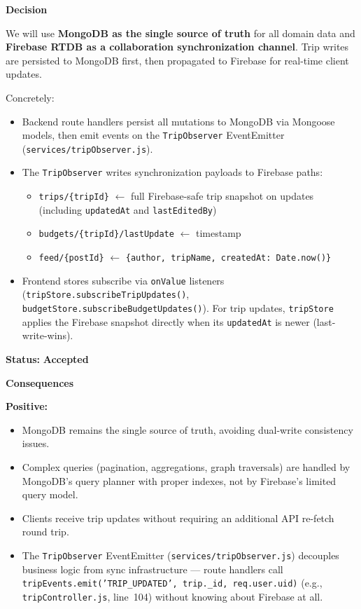 \documentclass[12pt, a4paper]{article}
\newcommand{\code}[1]{\texttt{\small #1}}
\newcommand{\adrstatus}[1]{\textcolor{adrstatus}{\textbf{#1}}}
\begin{document}
\begin{tcolorbox}[adrbox]
\vspace{0.6em}
\textbf{Decision}

We will use \textbf{MongoDB as the single source of truth} for all domain data and \textbf{Firebase RTDB as a collaboration synchronization channel}. Trip writes are persisted to MongoDB first, then propagated to Firebase for real-time client updates.

Concretely:
\begin{itemize}
  \item Backend route handlers persist all mutations to MongoDB via Mongoose models, then emit events on the \code{TripObserver} EventEmitter (\code{services/tripObserver.js}).
  \item The \code{TripObserver} writes synchronization payloads to Firebase paths:
    \begin{itemize}
      \item \code{trips/\{tripId\}} $\gets$ full Firebase-safe trip snapshot on updates (including \code{updatedAt} and \code{lastEditedBy})
      \item \code{budgets/\{tripId\}/lastUpdate} $\gets$ timestamp
      \item \code{feed/\{postId\}} $\gets$ \code{\{author, tripName, createdAt: Date.now()\}}
    \end{itemize}
  \item Frontend stores subscribe via \code{onValue} listeners (\code{tripStore.subscribeTripUpdates()}, \code{budgetStore.subscribeBudgetUpdates()}). For trip updates, \code{tripStore} applies the Firebase snapshot directly when its \code{updatedAt} is newer (last-write-wins).
\end{itemize}

\vspace{0.6em}
\textbf{Status:} \adrstatus{Accepted}

\vspace{0.6em}
\textbf{Consequences}

\textbf{Positive:}
\begin{itemize}
  \item MongoDB remains the single source of truth, avoiding dual-write consistency issues.
  \item Complex queries (pagination, aggregations, graph traversals) are handled by MongoDB's query planner with proper indexes, not by Firebase's limited query model.
  \item Clients receive trip updates without requiring an additional API re-fetch round trip.
  \item The \code{TripObserver} EventEmitter (\code{services/tripObserver.js}) decouples business logic from sync infrastructure --- route handlers call \code{tripEvents.emit('TRIP\_UPDATED', trip.\_id, req.user.uid)} (e.g., \code{tripController.js}, line~104) without knowing about Firebase at all.
\end{itemize}


\end{tcolorbox}
\end{document}
